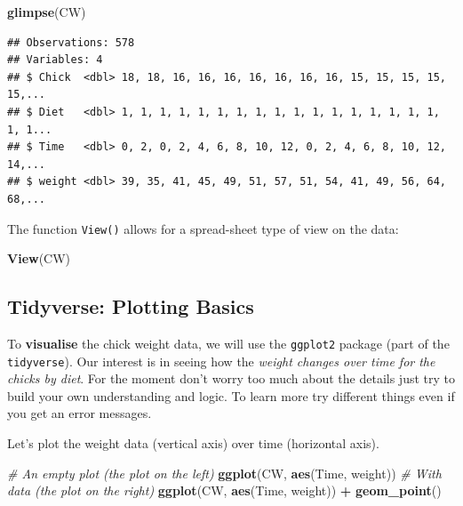 \documentclass[]{book}
\newenvironment{Shaded}{\begin{snugshade}}{\end{snugshade}}
\newcommand{\CommentTok}[1]{\textcolor[rgb]{0.56,0.35,0.01}{\textit{#1}}}
\newcommand{\KeywordTok}[1]{\textcolor[rgb]{0.13,0.29,0.53}{\textbf{#1}}}
\newcommand{\NormalTok}[1]{#1}
\newcommand{\OperatorTok}[1]{\textcolor[rgb]{0.81,0.36,0.00}{\textbf{#1}}}
\newcommand{\StringTok}[1]{\textcolor[rgb]{0.31,0.60,0.02}{#1}}
\theoremstyle{definition}
\theoremstyle{definition}
\theoremstyle{definition}
\theoremstyle{remark}
\begin{document}
\begin{Shaded}
\begin{Highlighting}[]
\KeywordTok{glimpse}\NormalTok{(CW)}
\end{Highlighting}
\end{Shaded}

\begin{verbatim}
## Observations: 578
## Variables: 4
## $ Chick  <dbl> 18, 18, 16, 16, 16, 16, 16, 16, 16, 15, 15, 15, 15, 15,...
## $ Diet   <dbl> 1, 1, 1, 1, 1, 1, 1, 1, 1, 1, 1, 1, 1, 1, 1, 1, 1, 1, 1...
## $ Time   <dbl> 0, 2, 0, 2, 4, 6, 8, 10, 12, 0, 2, 4, 6, 8, 10, 12, 14,...
## $ weight <dbl> 39, 35, 41, 45, 49, 51, 57, 51, 54, 41, 49, 56, 64, 68,...
\end{verbatim}

The function \texttt{View()} allows for a spread-sheet type of view on the data:

\begin{Shaded}
\begin{Highlighting}[]
\KeywordTok{View}\NormalTok{(CW)}
\end{Highlighting}
\end{Shaded}

\hypertarget{tidyverse-plotting-basics}{%
\subsection{Tidyverse: Plotting Basics}\label{tidyverse-plotting-basics}}

To \textbf{visualise} the chick weight data, we will use the \texttt{ggplot2} package (part of the
\texttt{tidyverse}). Our interest is in seeing how the \emph{weight changes over time for the chicks by
diet}. For the moment don't worry too much about the details just try to build your own
understanding and logic. To learn more try different things even if you get an error
messages.

Let's plot the weight data (vertical axis) over time (horizontal axis).

\begin{Shaded}
\begin{Highlighting}[]
\CommentTok{# An empty plot (the plot on the left)}
\KeywordTok{ggplot}\NormalTok{(CW, }\KeywordTok{aes}\NormalTok{(Time, weight))  }
\CommentTok{# With data (the plot on the right)}
\KeywordTok{ggplot}\NormalTok{(CW, }\KeywordTok{aes}\NormalTok{(Time, weight)) }\OperatorTok{+}\StringTok{ }\KeywordTok{geom_point}\NormalTok{() }
\end{Highlighting}
\end{Shaded}
\end{document}
